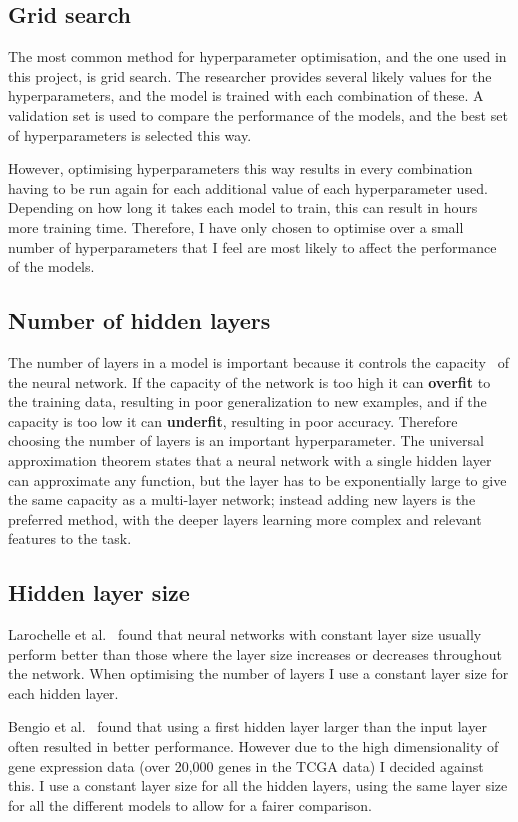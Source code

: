\documentclass[12pt,a4paper,twoside,openright]{report}
\begin{document}
\subsection{Grid search}
The most common method for hyperparameter optimisation, and the one used in this project, is grid search. The researcher provides several 
likely values for the hyperparameters, and the model is trained with each combination of these. A validation set is used to compare the
performance of the models, and the best set of hyperparameters is selected this way.

However, optimising hyperparameters this way results in every combination having to be run again for each additional value of each
hyperparameter used. Depending on how long it takes each model to train, this can result in hours more training time. 
Therefore, I have only chosen to optimise over a small number of hyperparameters that I feel are most likely to affect the performance of the models.

\subsection{Number of hidden layers}
The number of layers in a model is important because it controls the capacity~\cite{Goodfellow-et-al-2016} of the neural network. If the 
capacity of the network is too high it can \textbf{overfit} to the training data, resulting in poor generalization to new examples, and if the capacity is 
too low it can \textbf{underfit}, resulting in poor accuracy. Therefore choosing the number of layers is an important hyperparameter.
The universal approximation theorem states that a neural network with a single hidden layer can approximate any function, but the layer 
has to be exponentially large to give the same capacity as a multi-layer network; instead adding new layers is the preferred method, 
with the deeper layers learning more complex and relevant features to the task.

\subsection{Hidden layer size}
Larochelle et al.~\cite{DBLP:journals/jmlr/LarochelleBLL09} found that neural networks with constant layer size usually perform better than
those where the layer size increases or decreases throughout the network. When optimising the number of layers I use a constant layer size
for each hidden layer.

Bengio et al.~\cite{DBLP:series/lncs/Bengio12} found that using a first hidden layer larger than the input layer often resulted in 
better performance. However due to the high dimensionality of gene expression data (over 20,000 genes in the TCGA data) I decided against 
this. I use a constant layer size for all the hidden layers, using the same layer size for all the different models to allow for a fairer
comparison.
\end{document}
